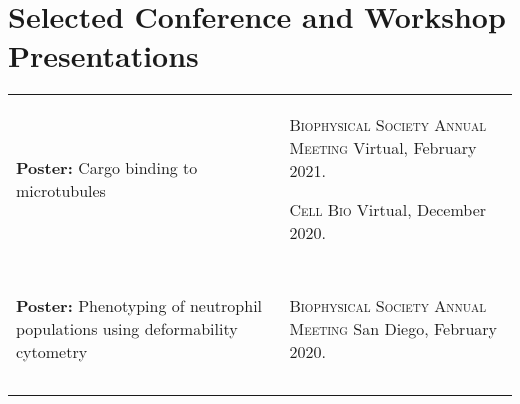 \documentclass[letterpaper,10pt]{article} %
\makeatletter
\newcommand\cellwidth{\TX@col@width}
\makeatother
\begin{document}
\bigskip
\section*{Selected Conference and Workshop Presentations}
\bigskip

\begin{tabularx}{\textwidth}{p{} | X}

\begin{minipage}{.4\textwidth}
\textbf{Poster:} Cargo binding to microtubules
\end{minipage}
&
\begin{minipage}{\cellwidth}
\begin{description}[itemsep=.25ex,labelsep=0em]
\item \textsc{Biophysical Society Annual Meeting} Virtual, February 2021.
\item \textsc{Cell Bio} Virtual, December 2020.
\end{description}
\end{minipage} \\

\multicolumn{2}{c}{} \\
\multicolumn{2}{c}{} \\

\begin{minipage}{.4\textwidth}
\textbf{Poster:} Phenotyping of neutrophil populations using deformability cytometry
\end{minipage}
&
\begin{minipage}{\cellwidth}
\begin{description}[itemsep=.25ex,labelsep=0em]
\item \textsc{Biophysical Society Annual Meeting} San Diego, February 2020.
\end{description}
\end{minipage} \\

\multicolumn{2}{c}{} \\
\multicolumn{2}{c}{} \\


\end{tabularx}
\end{document}
